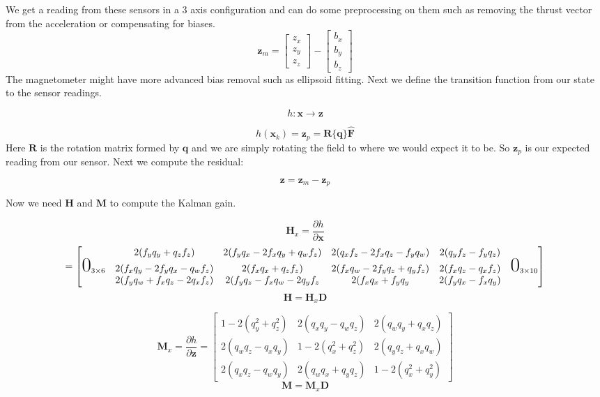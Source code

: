 \documentclass[11pt]{article}
\renewcommand{\vec}[1]{\mathbf{#1}}
\newcommand{\mat}[1]{\mathbf{#1}}
\begin{document}
	We get a reading from these sensors in a 3 axis configuration and can do some preprocessing on them such as removing the thrust vector from the acceleration or compensating for biases.
	$$\vec{z}_m = \begin{bmatrix}
	z_x \\ z_y \\ z_z
	\end{bmatrix} - \begin{bmatrix}
	b_x \\ b_y \\ b_z
	\end{bmatrix}$$
	The magnetometer might have more advanced bias removal such as ellipsoid fitting. Next we define the transition function from our state to the sensor readings.
	
	$$h: \vec{x} \to \vec{z}$$
	
	$$h(\vec{x}_k) = \vec{z}_p = \mat{R}\{\vec{q}\}\hat{\vec{F}}$$
	Here $\mat{R}$ is the rotation matrix formed by $\vec{q}$ and we are simply rotating the field to where we would expect it to be. So $\vec{z}_p$ is our expected reading from our sensor. Next we compute the residual:
	
	$$\vec{z} = \vec{z}_m - \vec{z}_p$$
	
	Now we need $\mat{H}$ and $\mat{M}$ to compute the Kalman gain.
	
	$$\mat{H}_x = \frac{\partial h}{\partial \vec{x}}$$  $$=\begin{bmatrix}
	 &2(f_yq_y+q_zf_z) & 2(f_yq_x-2f_xq_y+q_wf_z) & 2(q_xf_z-2f_xq_z-f_yq_w) & 2(q_yf_z-f_yq_z)\\
	\text{\huge0}_{3\times 6} & 2(f_xq_y-2f_yq_x-q_wf_z) &  2(f_xq_x+q_zf_z) & 2(f_xq_w - 2f_yq_z+q_yf_z) & 2(f_xq_z-q_xf_z) & \text{\huge0}_{3\times 10}\\
	 &2(f_yq_w + f_xq_z-2q_xf_z) & 2(f_yq_z-f_xq_w-2q_yf_z & 2(f_xq_x + f_yq_y & 2(f_yq_x-f_xq_y)
	
	\end{bmatrix}$$
	$$\mat{H} = \mat{H}_x \mat{D}$$
	
	$$\mat{M}_x = \frac{\partial h}{\partial \vec{z}} = \begin{bmatrix}
	1 - 2(q_y^2 + q_z^2) & 2(q_xq_y-q_wq_z) & 2(q_wq_y+q_xq_z)\\
	2(q_wq_z-q_xq_y) & 1 - 2(q_x^2 + q_z^2) & 2(q_yq_z+q_xq_w)\\
	2(q_xq_z-q_wq_y) & 2(q_wq_x+q_yq_z) & 1 - 2(q_x^2 + q_y^2)
	\end{bmatrix}$$
	$$\mat{M} = \mat{M}_x\mat{D}$$
	
\end{document}
